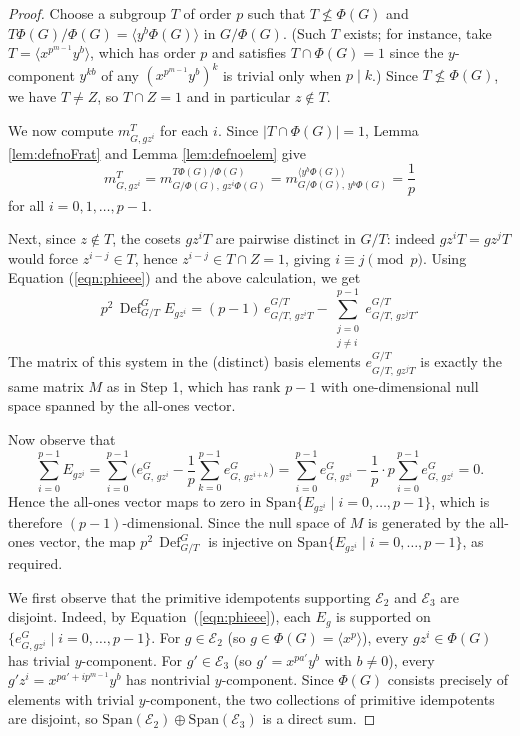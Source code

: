 \documentclass[12pt]{article}
\theoremstyle{plain}
\theoremstyle{definition}
\newcommand{\defl}{\operatorname{Def}}
\begin{document}
\begin{proof}
Choose a subgroup $T$ of order $p$ such that $T \not\leq \Phi(G)$ and 
$T\Phi(G)/\Phi(G) = \langle y^b\Phi(G)\rangle$ in $G/\Phi(G)$. (Such $T$ exists; for 
instance, take $T = \langle x^{p^{m-1}}y^b \rangle$, which has order $p$ and satisfies 
$T \cap \Phi(G) = 1$ since the $y$-component $y^{kb}$ of any $(x^{p^{m-1}}y^b)^k$ is 
trivial only when $p \mid k$.) Since $T \not\leq \Phi(G)$, we have $T \neq Z$, so $T \cap Z = 1$ 
and in particular $z \notin T$.

We now compute $m_{G, gz^i}^T$ for each $i$. Since $|T \cap \Phi(G)| = 1$, Lemma 
\ref{lem:defnoFrat} and Lemma \ref{lem:defnoelem} give
\[
m_{G, gz^i}^T = m_{G/\Phi(G),\, gz^i\Phi(G)}^{T\Phi(G)/\Phi(G)} = m_{G/\Phi(G),\, y^b\Phi(G)}^{\langle y^b\Phi(G)\rangle} = \frac{1}{p}
\]
for all $i = 0, 1, \ldots, p-1$.

Next, since $z \notin T$, the cosets $gz^i T$ are pairwise distinct in $G/T$: indeed 
$gz^iT = gz^jT$ would force $z^{i-j} \in T$, hence $z^{i-j} \in T \cap Z = 1$, 
giving $i \equiv j \pmod{p}$.
Using Equation (\ref{eqn:phieee}) and the above calculation, we get
\[
p^2\, \defl^G_{G/T} E_{gz^i} = (p-1)\,e_{G/T,\, gz^iT}^{G/T} - \sum_{\substack{j=0 \\ j\neq i}}^{p-1} e_{G/T,\, gz^jT}^{G/T}.
\]
The matrix of this system in the (distinct) basis elements $e_{G/T,\, gz^jT}^{G/T}$ is 
exactly the same matrix $M$ as in Step 1, which has rank $p-1$ with 
one-dimensional null space spanned by the all-ones vector. 

Now observe that
\[
\sum_{i=0}^{p-1} E_{gz^i} 
= \sum_{i=0}^{p-1}\bigg(e_{G,\, gz^i}^G - \frac{1}{p}\sum_{k=0}^{p-1}e_{G,\, gz^{i+k}}^G\bigg)
= \sum_{i=0}^{p-1}e_{G,\, gz^i}^G - \frac{1}{p}\cdot p\sum_{i=0}^{p-1}e_{G,\, gz^i}^G = 0.
\]
Hence the all-ones vector maps to zero in $\mathrm{Span}\{E_{gz^i} \mid i = 0, \ldots, p-1\}$, 
which is therefore $(p-1)$-dimensional. Since the null space of $M$ is generated by the 
all-ones vector, the map $p^2\,\defl^G_{G/T}$ is injective on 
$\mathrm{Span}\{E_{gz^i} \mid i = 0, \ldots, p-1\}$, as required.

 We first observe that the primitive
idempotents supporting $\mathcal{E}_2$ and $\mathcal{E}_3$ are
disjoint. Indeed, by Equation~(\ref{eqn:phieee}), each $E_g$ is supported on
$\{e_{G,gz^i}^G \mid i = 0, \ldots, p-1\}$. For $g \in \mathcal{E}_2$ (so
$g \in \Phi(G) = \langle x^p \rangle$), every $gz^i \in \Phi(G)$ has trivial
$y$-component. For $g' \in \mathcal{E}_3$ (so $g' = x^{pa'}y^b$ with $b \neq 0$),
every $g'z^i = x^{pa'+ip^{m-1}}y^b$ has nontrivial $y$-component. Since
$\Phi(G)$ consists precisely of elements with trivial $y$-component,
the two collections of primitive idempotents are disjoint, so
$\mathrm{Span}(\mathcal{E}_2) \oplus \mathrm{Span}(\mathcal{E}_3)$ is a direct sum.


\end{proof}
\end{document}
